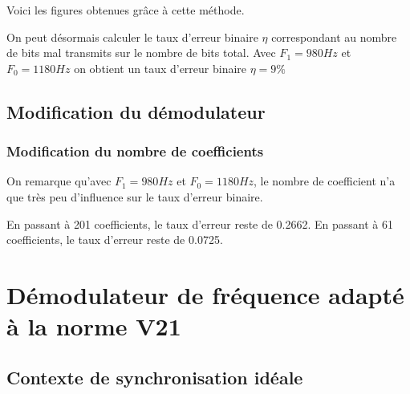 \documentclass{article}
\begin{document}
Voici les figures obtenues grâce à cette méthode.


On peut désormais calculer le taux d'erreur binaire $\eta$ correspondant au nombre de bits mal transmits sur le nombre de bits total.
Avec $F_1=980Hz$ et $F_0=1180Hz$ on obtient un taux d'erreur binaire $\eta=9\%$
\subsection{Modification du démodulateur} 

\subsubsection{Modification du nombre de coefficients}

On remarque qu'avec $F_1=980Hz$ et $F_0=1180Hz$, le nombre de coefficient n'a que très peu d'influence sur le taux d'erreur binaire.

En passant à 201 coefficients, le taux d'erreur reste de 0.2662.
En passant à 61 coefficients, le taux d'erreur reste de 0.0725. 








\section{Démodulateur de fréquence adapté à la norme V21}

\subsection{Contexte de synchronisation idéale}
\label{synchro-ideale}
\end{document}

